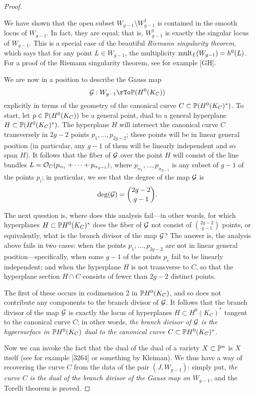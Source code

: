\begin{proof}
\begin{fact}
We have shown that the open subset $W_{g-1} \setminus W^1_{g-1}$ is contained in the smooth locus of $W_{g-1}$. In fact, they are equal; that is, $W^1_{g-1}$ is exactly the singular locus of $W_{g-1}$. This is a special case of the beautiful \emph{Riemann singularity theorem}, which says that for any point $L \in W_{g-1}$, the multiplicity $\mult_L(W_{g-1}) = h^0(L)$. For a proof of the Riemann singularity theorem, see for example [GH]. 
\end{fact}


We are now in a position to describe the Gauss map
$$
\cG : W_{g-1} \rTo  \PP(H^0(K_C))
$$
explicitly in terms of the geometry of the canonical curve $C \subset \PP(H^0(K_C)^*)$. To start, let $p \in \PP(H^0(K_C))$ be a general point, dual to a general hyperplane $H \subset \PP(H^0(K_C)^*)$. The hyperplane $H$ will intersect the canonical curve $C$ transversely in $2g-2$ points $p_1,\dots,p_{2g-2}$; these points will be in linear general position (in particular, any $g-1$ of them will be linearly independent and so span $H$). It follows that the fiber of $\cG$ over the point $H$ will consist of the line bundles $L = \cO_C(p_{\alpha_1} + \dots + p_{\alpha_{g-1}})$, where $p_{\alpha_1}, \dots, p_{\alpha_{g-1}}$ is any subset of $g-1$ of the points $p_i$; in particular, we see that the degree of the map $\cG$ is
$$
\deg (\cG) = \binom{2g-2}{g-1}.
$$

The next question is, where does this analysis fail---in other words, for which hyperplanes $H \subset \PP H^0(K_C)^*$ does the fiber of $\cG$ not consist of $\binom{2g-2}{g-1}$ points, or equivalently,
what is the branch divisor of the map $\cG$? The answer is, the analysis above fails in two cases: when the points $p_1,\dots, p_{2g-2}$ are not in linear general position---specifically, when some $g-1$ of the points $p_i$ fail to be linearly independent; and when the hyperplane $H$ is not transverse to $C$, so that the hyperplane section $H \cap C$ consists of fewer than $2g-2$ distinct points.

The first of these occurs in codimension 2 in $\PP H^0(K_C)$, and so does not contribute any components to the branch divisor of $\cG$. It follows that the branch divisor of the map $\cG$ is exactly the locus of hyperplanes $H \subset H^0(K_C)^*$ tangent to the canonical curve $C$; in other words, \emph{the branch divisor of $\cG$ is the hypersurface in $\PP H^0(K_C)$ dual to the canonical curve $C \subset \PP H^0(K_C)^*$}.

Now we can  invoke the fact that the dual of the dual of a variety $X \subset \PP^n$ is $X$ itself (see for example [3264] or something by Kleiman). We thus have a way of recovering the curve $C$ from the data of the pair $(J, W_{g-1})$: simply put, \emph{the curve $C$ is the dual of the branch divisor of the Gauss map on $W_{g-1}$}, and the Torelli theorem is proved.

\end{proof}

